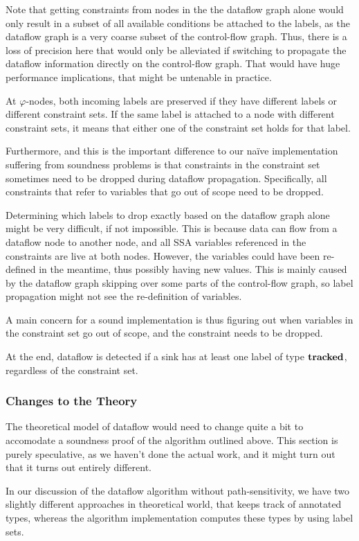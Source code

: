 Note that getting constraints from nodes in the the dataflow graph alone would only result in a subset of all available
conditions be attached to the labels, as the dataflow graph is a very coarse subset of 
the control-flow graph. Thus, there is a loss of precision here that would only be alleviated
if switching to propagate the dataflow information directly on the control-flow graph.
That would have huge performance implications, that might be untenable in practice.

At $\varphi$-nodes, both incoming labels are preserved if they have different labels or different constraint sets.
If the same label is attached to a node with different constraint sets, it means that
either one of the constraint set holds for that label.

Furthermore, and this is the important difference to our na\"ive implementation suffering from
soundness problems is that constraints in the constraint set sometimes need to be dropped 
during dataflow propagation.
Specifically, all constraints that refer to variables that go out of scope need to be dropped.

Determining which labels to drop exactly based on the dataflow graph alone might
be very difficult, if not impossible.
This is because data can flow from a dataflow node to another node,
and all SSA variables referenced in the constraints are live at both nodes.
However, the variables could have been re-defined in the meantime, thus possibly having new values.
This is mainly caused by the dataflow graph skipping over some parts of the
control-flow graph, so label propagation might not see the re-definition of variables.

A main concern for a sound implementation is thus figuring out when variables in the
constraint set go out of scope, and the constraint needs to be dropped.

At the end, dataflow is detected if a sink has at least one label of type $\textbf{tracked}$,
regardless of the constraint set.

\subsubsection*{Changes to the Theory}
The theoretical model of dataflow would need to change quite a bit to accomodate 
a soundness proof of the algorithm outlined above.
This section is purely speculative, as we haven't done the actual work, and it might turn out
that it turns out entirely different.

In our discussion of the dataflow algorithm without path-sensitivity, we have two slightly
different approaches in theoretical world, that keeps track of annotated types, whereas
the algorithm implementation computes these types by using label sets.

